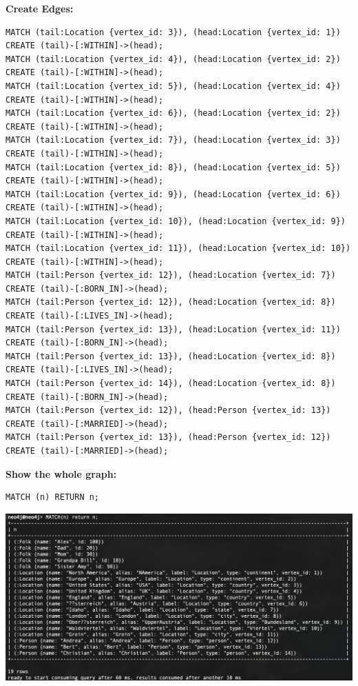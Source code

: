 \documentclass[14pt,a4paper]{extarticle}
\begin{document}
	\noindent \textbf{Create Edges:}
	\begin{lstlisting}[style=sql]
MATCH (tail:Location {vertex_id: 3}), (head:Location {vertex_id: 1}) CREATE (tail)-[:WITHIN]->(head);
MATCH (tail:Location {vertex_id: 4}), (head:Location {vertex_id: 2}) CREATE (tail)-[:WITHIN]->(head);
MATCH (tail:Location {vertex_id: 5}), (head:Location {vertex_id: 4}) CREATE (tail)-[:WITHIN]->(head);
MATCH (tail:Location {vertex_id: 6}), (head:Location {vertex_id: 2}) CREATE (tail)-[:WITHIN]->(head);
MATCH (tail:Location {vertex_id: 7}), (head:Location {vertex_id: 3}) CREATE (tail)-[:WITHIN]->(head);
MATCH (tail:Location {vertex_id: 8}), (head:Location {vertex_id: 5}) CREATE (tail)-[:WITHIN]->(head);
MATCH (tail:Location {vertex_id: 9}), (head:Location {vertex_id: 6}) CREATE (tail)-[:WITHIN]->(head);
MATCH (tail:Location {vertex_id: 10}), (head:Location {vertex_id: 9}) CREATE (tail)-[:WITHIN]->(head);
MATCH (tail:Location {vertex_id: 11}), (head:Location {vertex_id: 10}) CREATE (tail)-[:WITHIN]->(head);
MATCH (tail:Person {vertex_id: 12}), (head:Location {vertex_id: 7}) CREATE (tail)-[:BORN_IN]->(head);
MATCH (tail:Person {vertex_id: 12}), (head:Location {vertex_id: 8}) CREATE (tail)-[:LIVES_IN]->(head);
MATCH (tail:Person {vertex_id: 13}), (head:Location {vertex_id: 11}) CREATE (tail)-[:BORN_IN]->(head);
MATCH (tail:Person {vertex_id: 13}), (head:Location {vertex_id: 8}) CREATE (tail)-[:LIVES_IN]->(head);
MATCH (tail:Person {vertex_id: 14}), (head:Location {vertex_id: 8}) CREATE (tail)-[:BORN_IN]->(head);
MATCH (tail:Person {vertex_id: 12}), (head:Person {vertex_id: 13}) CREATE (tail)-[:MARRIED]->(head);
MATCH (tail:Person {vertex_id: 13}), (head:Person {vertex_id: 12}) CREATE (tail)-[:MARRIED]->(head);
	\end{lstlisting}

	\pagebreak

	\noindent \textbf{Show the whole graph:}
	\begin{lstlisting}[style=sql]
MATCH (n) RETURN n;
	\end{lstlisting}
	\includegraphics[width=\textwidth]{images/sc01.png}
\end{document}
